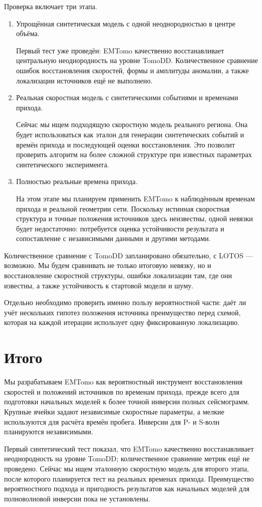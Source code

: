 \documentclass[12pt,a4paper]{article}
\begin{document}
Проверка включает три этапа.

\begin{enumerate}
    \item Упрощённая синтетическая модель с одной неоднородностью
    в центре объёма.

    Первый тест уже проведён: EMTomo качественно восстанавливает
    центральную неоднородность на уровне TomoDD. Количественное
    сравнение ошибок восстановления скоростей, формы и амплитуды
    аномалии, а также локализации источников ещё не выполнено.

    \item Реальная скоростная модель с синтетическими событиями
    и временами прихода.

    Сейчас мы ищем подходящую скоростную модель реального региона.
    Она будет использоваться как эталон для генерации синтетических
    событий и времён прихода и последующей оценки восстановления.
    Это позволит проверить алгоритм на более сложной структуре
    при известных параметрах синтетического эксперимента.

    \item Полностью реальные времена прихода.

    На этом этапе мы планируем применить EMTomo к наблюдённым временам
    прихода и реальной геометрии сети. Поскольку истинная скоростная
    структура и точные положения источников здесь неизвестны,
    одной невязки будет недостаточно: потребуется оценка устойчивости
    результата и сопоставление с независимыми данными и другими методами.
\end{enumerate}

Количественное сравнение с TomoDD запланировано обязательно,
с LOTOS --- возможно. Мы будем сравнивать не только итоговую невязку, но и
восстановление скоростной структуры, ошибки локализации там, где они
известны, а также устойчивость к стартовой модели и шуму.

Отдельно необходимо проверить именно пользу вероятностной части:
даёт ли учёт нескольких гипотез положения источника преимущество перед
схемой, которая на каждой итерации использует одну фиксированную
локализацию.

\section*{Итого}

Мы разрабатываем EMTomo как вероятностный инструмент восстановления
скоростей и положений источников по временам прихода, прежде всего для
подготовки начальных моделей к более точной инверсии полных сейсмограмм.
Крупные ячейки задают независимые скоростные параметры, а мелкие
используются для расчёта времён пробега. Инверсии для P- и S-волн
планируются независимыми.

Первый синтетический тест показал, что EMTomo качественно
восстанавливает неоднородность на уровне TomoDD; количественное
сравнение метрик ещё не проведено. Сейчас мы ищем эталонную
скоростную модель для второго этапа, после которого планируется
тест на реальных временах прихода. Преимущество вероятностного
подхода и пригодность результатов как начальных моделей для
полноволновой инверсии пока не установлены.
\end{document}
